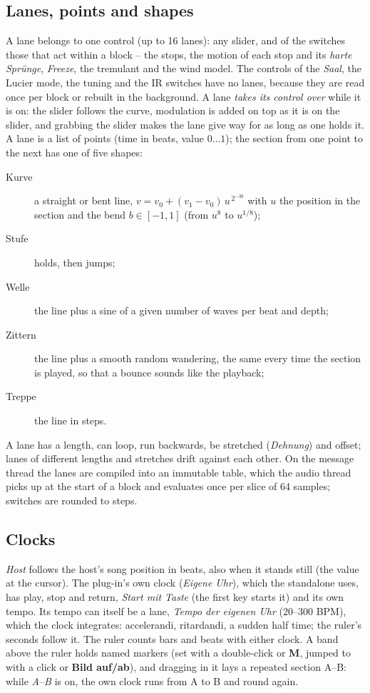 \documentclass[11pt,a4paper,parskip=half,DIV=11,toc=bibliography]{scrartcl}
\newcommand{\ui}[1]{\emph{#1}}                 %
\begin{document}
\subsection{Lanes, points and shapes}
A lane belongs to one control (up to 16 lanes): any slider, and of the switches those that act within a block -- the stops, the motion of each stop and its
\ui{harte Sprünge}, \ui{Freeze}, the tremulant and the wind model. The controls of the \ui{Saal}, the Lucier mode, the tuning and the IR switches have
no lanes, because they are read once per block or rebuilt in the background. A lane \emph{takes its control over} while it is on: the slider follows the
curve, modulation is added on top as it is on the slider, and grabbing the slider makes the lane give way for as long as one holds it. A lane is a list
of points (time in beats, value $0\dots1$); the section from one point to the next has one of five shapes:
\begin{description}
  \item[Kurve] a straight or bent line, $v=v_0+(v_1-v_0)\,u^{\,2^{-3b}}$ with $u$ the position in the section and the bend $b\in[-1,1]$ (from $u^8$
        to $u^{1/8}$);
  \item[Stufe] holds, then jumps;
  \item[Welle] the line plus a sine of a given number of waves per beat and depth;
  \item[Zittern] the line plus a smooth random wandering, the same every time the section is played, so that a bounce sounds like the playback;
  \item[Treppe] the line in steps.
\end{description}
A lane has a length, can loop, run backwards, be stretched (\ui{Dehnung}) and offset; lanes of different lengths and stretches drift against each other.
On the message thread the lanes are compiled into an immutable table, which the audio thread picks up at the start of a block and evaluates once per
slice of 64 samples; switches are rounded to steps.

\subsection{Clocks}
\ui{Host} follows the host's song position in beats, also when it stands still (the value at the cursor). The plug-in's own clock (\ui{Eigene Uhr}),
which the standalone uses, has play, stop and return, \ui{Start mit Taste} (the first key starts it) and its own tempo. Its tempo can itself be a lane,
\ui{Tempo der eigenen Uhr} (20--300 BPM), which the clock integrates: accelerandi, ritardandi, a sudden half time; the ruler's seconds follow it.
The ruler counts bars and beats with either clock.
A band above the ruler holds named markers (set with a double-click or \textbf{M}, jumped to with a click or \textbf{Bild auf/ab}), and dragging in it
lays a repeated section A--B: while \ui{A--B} is on, the own clock runs from A to B and round again.
\end{document}
